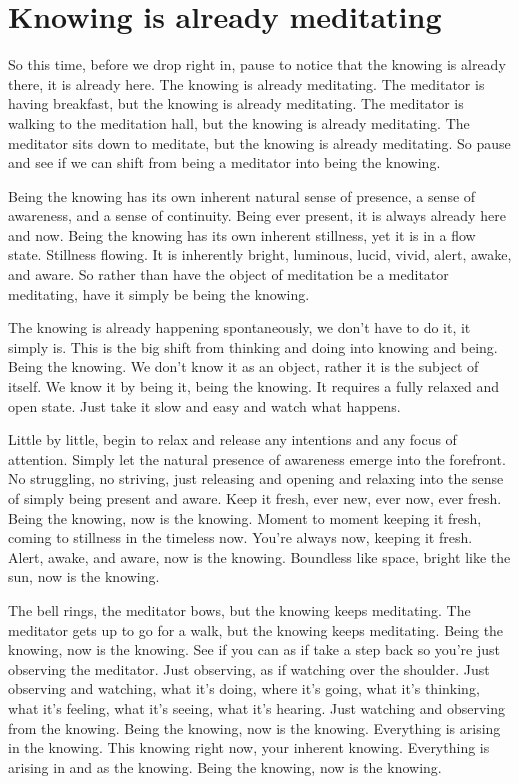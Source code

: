 \documentclass[12pt,openany]{book}
\begin{document}
\chapter*{Knowing is already meditating}

So this time, before we drop right in, pause to notice that the knowing is already there, it is already here. The knowing is already meditating. The meditator is having breakfast, but the \linebreak knowing is already meditating. The meditator is walking to the meditation hall, but the knowing is already meditating. The meditator sits down to meditate, but  the knowing is already meditating. So pause and see if we can shift from being a meditator into being the knowing.

Being the knowing has its own inherent natural sense of presence, a sense of awareness, and a sense of continuity. Being ever present, it is always already here and now. Being the knowing has its own inherent stillness, yet it is in a flow state. Stillness flowing. It is inherently bright, luminous, lucid, vivid, alert, awake, and aware. So rather than have the object of meditation be a meditator meditating, have it simply be being the knowing.

The knowing is already happening spontaneously, we don't have to do it, it simply is. This is the big shift from thinking and doing into knowing and being. Being the knowing. We don't know it as an object, rather it is the subject of itself. We know it by being it, being the knowing. It requires a fully relaxed and open state. Just take it slow and easy and watch what happens.

Little by little, begin to relax and release any intentions and any focus of attention. Simply let the natural presence of awareness emerge into the forefront. No struggling, no striving, just releasing and opening and relaxing into the sense of simply being present and aware. Keep it fresh, ever new, ever now, ever fresh. Being the knowing, now is the knowing. Moment to moment keeping it fresh, coming to stillness in the timeless now. You’re always now, keeping it fresh. Alert, awake, and aware, now is the knowing. Boundless like space, bright like the sun, now is the knowing.

The bell rings, the meditator bows, but the knowing keeps meditating. The meditator gets up to go for a walk, but the knowing keeps meditating. Being the knowing, now is the knowing. See if you can as if take a step back so you're just observing the meditator. Just observing, as if watching over the shoulder. Just observing and watching, what it's doing, where it's going, what it's thinking, what it's feeling, what it's seeing, what it's hearing. Just watching and observing from the knowing. Being the knowing, now is the knowing. Everything is arising in the knowing. This knowing right now, your inherent knowing. Everything is arising in and as the knowing. Being the knowing, now is the knowing. 
\end{document}
